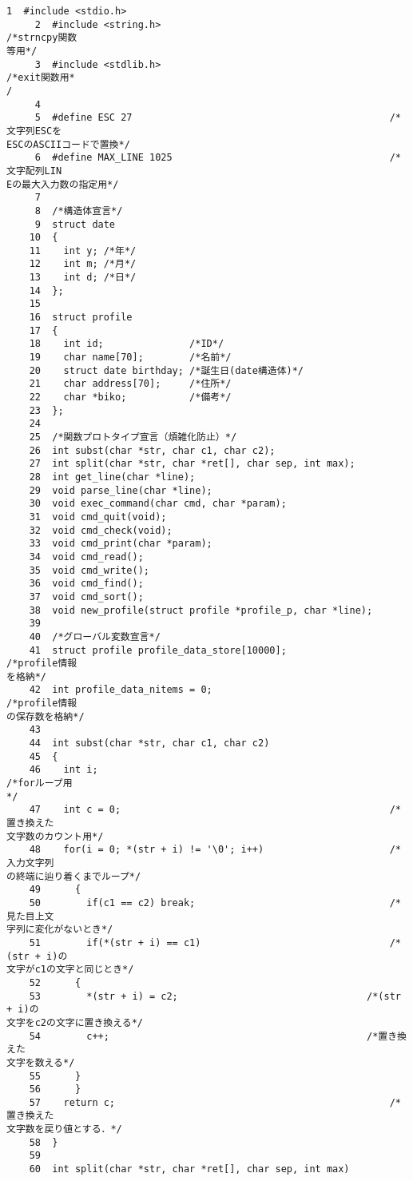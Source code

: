 \begin{Verbatim}[fontsize=\small, baselinestretch=0.8]
     1	#include <stdio.h>
     2	#include <string.h>                                        /*strncpy関数
等用*/
     3	#include <stdlib.h>                                        /*exit関数用*
/
     4	
     5	#define ESC 27                                             /*文字列ESCを
ESCのASCIIコードで置換*/
     6	#define MAX_LINE 1025                                      /*文字配列LIN
Eの最大入力数の指定用*/
     7	
     8	/*構造体宣言*/
     9	struct date
    10	{
    11	  int y; /*年*/
    12	  int m; /*月*/
    13	  int d; /*日*/
    14	};
    15	
    16	struct profile
    17	{
    18	  int id;               /*ID*/
    19	  char name[70];        /*名前*/
    20	  struct date birthday; /*誕生日(date構造体)*/
    21	  char address[70];     /*住所*/
    22	  char *biko;           /*備考*/
    23	};
    24	
    25	/*関数プロトタイプ宣言（煩雑化防止）*/
    26	int subst(char *str, char c1, char c2);
    27	int split(char *str, char *ret[], char sep, int max);
    28	int get_line(char *line);
    29	void parse_line(char *line);
    30	void exec_command(char cmd, char *param);
    31	void cmd_quit(void);
    32	void cmd_check(void);
    33	void cmd_print(char *param);
    34	void cmd_read();
    35	void cmd_write();
    36	void cmd_find();
    37	void cmd_sort();
    38	void new_profile(struct profile *profile_p, char *line);
    39	
    40	/*グローバル変数宣言*/
    41	struct profile profile_data_store[10000];                  /*profile情報
を格納*/
    42	int profile_data_nitems = 0;                               /*profile情報
の保存数を格納*/
    43	
    44	int subst(char *str, char c1, char c2)
    45	{
    46	  int i;                                                   /*forループ用
*/
    47	  int c = 0;                                               /*置き換えた
文字数のカウント用*/
    48	  for(i = 0; *(str + i) != '\0'; i++)                      /*入力文字列
の終端に辿り着くまでループ*/
    49	    {
    50	      if(c1 == c2) break;                                  /*見た目上文
字列に変化がないとき*/
    51	      if(*(str + i) == c1)                                 /*(str + i)の
文字がc1の文字と同じとき*/
    52		{
    53		  *(str + i) = c2;                                 /*(str + i)の
文字をc2の文字に置き換える*/
    54		  c++;                                             /*置き換えた
文字を数える*/
    55		}
    56	    }
    57	  return c;                                                /*置き換えた
文字数を戻り値とする．*/
    58	}
    59	
    60	int split(char *str, char *ret[], char sep, int max)

\end{Verbatim}
